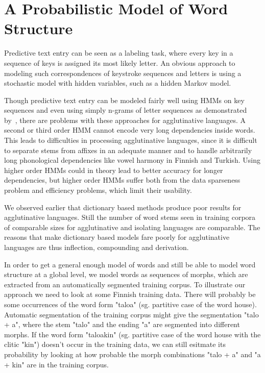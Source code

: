 \documentclass{llncs}
\begin{document}
\section{A Probabilistic Model of Word Structure}\label{model}

Predictive text entry can be seen as a labeling task, where every key
in a sequence of keys is assigned its most likely letter. An obvious
approach to modeling such correspondences of keystroke sequences and
letters is using a stochastic model with hidden variables, such as a
hidden Markov model.

Though predictive text entry can be modeled fairly well using HMMs on
key sequences and even using simply n-grams of letter sequences as
demonstrated by~\cite{Tantug:2010}, there are problems with these
approaches for agglutinative languages. A second or third order HMM
cannot encode very long dependencies inside words. This leads to
difficulties in processing agglutinative languages, since it is
difficult to separate stems from affixes in an adequate manner and to
handle arbitrarily long phonological dependencies like vowel harmony
in Finnish and Turkish. Using higher order HMMs could in theory lead
to better accuracy for longer dependencies, but higher order HMMs
suffer both from the data sparseness problem and efficiency problems,
which limit their usability.

We observed earlier that dictionary based methods produce poor results
for agglutinative languages. Still the number of word stems seen in
training corpora of comparable sizes for agglutinative and isolating
languages are comparable. The reasons that make dictionary based
models fare poorly for agglutinative languages are thus inflection,
compounding and derivation. 

In order to get a general enough model of words and still be able to
model word structure at a global level, we model words as sequences of
morphs, which are extracted from an automatically segmented training
corpus. To illustrate our approach we need to look at some Finnish
training data. There will probably be some occurrences of the word
form "taloa" (sg. partitive case of the word house). Automatic
segmentation of the training corpus might give the segmentation "talo
+ a", where the stem "talo" and the ending "a" are segmented into
different morphs. If the word form "taloakin" (sg. partitive case of
the word house with the clitic "kin") doesn't occur in the training
data, we can still esitmate its probability by looking at how probable
the morph combinations "talo + a" and "a + kin" are in the training
corpus.
\end{document}

